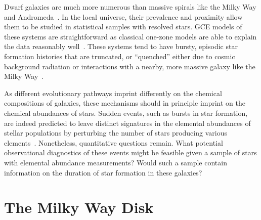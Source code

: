 \documentclass[main.tex]{subfiles}
\begin{document}
\begin{doublespace}
Dwarf galaxies are much more numerous than massive spirals like the Milky Way
and Andromeda~\citep[e.g.,][]{Bell2003, Baldry2012}.
In the local universe, their prevalence and proximity allow them to be studied
in statistical samples with resolved stars.
GCE models of these systems are straightforward as classical one-zone models
are able to explain the data reasonably well~\citep[see, e.g.,][]{Kirby2011,
delosReyes2022}.
These systems tend to have bursty, episodic star formation histories
\citep[e.g.,][]{Weisz2014a} that are truncated, or ``quenched'' either due to
cosmic background radiation or interactions with a nearby, more massive galaxy
like the Milky Way~\citep[e.g.,][]{Weisz2014b, Weisz2015, Naidu2022}.
\par
As different evolutionary pathways imprint differently on the chemical
compositions of galaxies, these mechanisms should in principle imprint on the
chemical abundances of stars.
Sudden events, such as bursts in star formation, are indeed predicted to leave
distinct signatures in the elemental abundances of stellar populations by
perturbing the number of stars producing various elements~\citep{Weinberg2017b}.
Nonetheless, quantitative questions remain.
What potential observational diagnostics of these events might be feasible
given a sample of stars with elemental abundance measurements?
Would such a sample contain information on the duration of star formation in
these galaxies?

\section{The Milky Way Disk}
\label{main:sec:intro:mw}


\end{doublespace}
\end{document}
